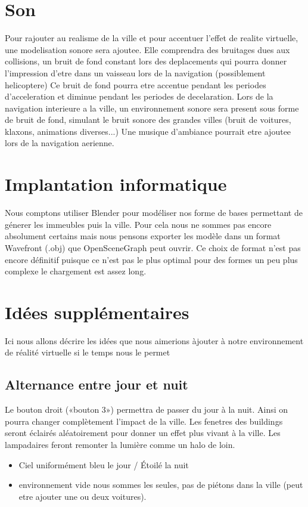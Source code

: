 \documentclass[a4paper,12pt]{article}
\begin{document}
 
\section{Son}
Pour rajouter au realisme de la ville et pour accentuer l'effet de realite virtuelle, une modelisation sonore sera ajoutee. 
Elle comprendra des bruitages dues aux collisions, un bruit de fond constant lors des deplacements qui pourra donner l'impression d'etre dans un vaisseau lors de la navigation (possiblement helicoptere)
Ce bruit de fond pourra etre accentue pendant les periodes d'acceleration et diminue pendant  les periodes de decelaration.
Lors de la navigation interieure a la ville, un environnement sonore sera present sous forme de bruit de fond, simulant le bruit sonore des grandes villes (bruit de voitures, klaxons, animations diverses...)
Une musique d'ambiance pourrait etre ajoutee lors de la navigation aerienne.
 
\section{Implantation informatique}
Nous comptons utiliser Blender pour modéliser nos forme de bases permettant de génerer les immeubles puis la ville. Pour cela nous ne sommes pas encore absolument certains mais nous pensons exporter les modèle dans un format Wavefront (.obj) que OpenSceneGraph peut ouvrir. Ce choix de format n'est pas encore définitif puisque ce n'est pas le plus optimal pour des formes un peu plus complexe le chargement est assez long.

 
\section{Idées supplémentaires}
Ici nous allons décrire les idées que nous aimerions àjouter à notre environnement de réalité virtuelle si le temps nous le permet

\subsection{Alternance entre jour et nuit}
Le bouton droit («bouton 3») permettra de passer du jour à la nuit. Ainsi on pourra changer complètement l'impact de la ville. Les fenetres des buildings seront éclairés aléatoirement pour donner un effet plus vivant à la ville. Les lampadaires feront remonter la lumière comme un halo de loin.
\begin{itemize}
\item Ciel uniformément bleu le jour / Étoilé la nuit
\item environnement vide nous sommes les seules, pas de piétons dans la ville (peut etre ajouter une ou deux voitures).
\end{itemize}
 
\end{document}

